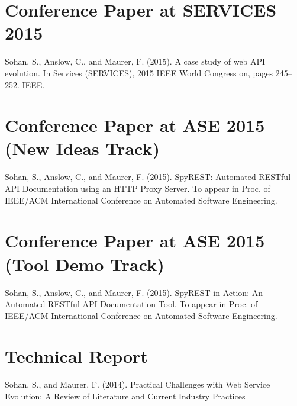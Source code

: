 \documentclass[11pt,oneside]{book}
\begin{document}
\begin{appendices}

\chapter{Conference Paper at SERVICES 2015}

Sohan, S., Anslow, C., and Maurer, F. (2015). A case study of web API evolution. In Services (SERVICES), 2015 IEEE World Congress on, pages 245–252. IEEE.

\chapter{Conference Paper at ASE 2015 (New Ideas Track)}

Sohan, S., Anslow, C., and Maurer, F. (2015). SpyREST: Automated RESTful API Documentation using an HTTP Proxy Server. To appear in Proc. of IEEE/ACM International Conference on Automated Software Engineering.

\chapter{Conference Paper at ASE 2015 (Tool Demo Track)}

Sohan, S., Anslow, C., and Maurer, F. (2015). SpyREST in Action: An Automated RESTful API Documentation Tool. To appear in Proc. of IEEE/ACM International Conference on Automated Software Engineering.

\chapter{Technical Report}

Sohan, S., and Maurer, F. (2014). Practical Challenges with Web Service Evolution: A Review of Literature and Current Industry Practices
\end{appendices}
\end{document}
